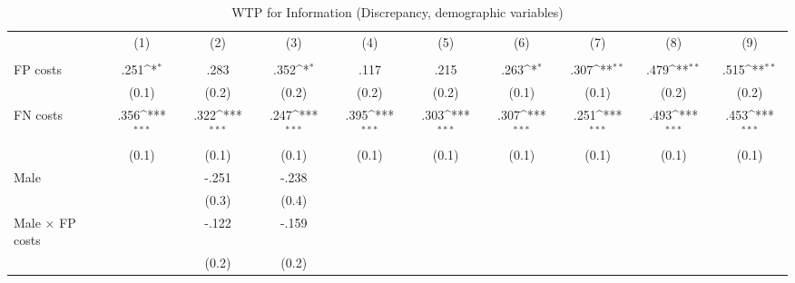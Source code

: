 \begin{table}[htbp]\centering
\def\sym#1{\ifmmode^{#1}\else\(^{#1}\)\fi}
\caption{WTP for Information (Discrepancy, demographic variables)}
\begin{tabular}{l*{9}{c}}
\hline\hline
                &\multicolumn{1}{c}{(1)}&\multicolumn{1}{c}{(2)}&\multicolumn{1}{c}{(3)}&\multicolumn{1}{c}{(4)}&\multicolumn{1}{c}{(5)}&\multicolumn{1}{c}{(6)}&\multicolumn{1}{c}{(7)}&\multicolumn{1}{c}{(8)}&\multicolumn{1}{c}{(9)}\\
                &\multicolumn{1}{c}{}&\multicolumn{1}{c}{}&\multicolumn{1}{c}{}&\multicolumn{1}{c}{}&\multicolumn{1}{c}{}&\multicolumn{1}{c}{}&\multicolumn{1}{c}{}&\multicolumn{1}{c}{}&\multicolumn{1}{c}{}\\
\hline
FP costs        &     .251\sym{*}  &     .283         &     .352\sym{*}  &     .117         &     .215         &     .263\sym{*}  &     .307\sym{**} &     .479\sym{**} &     .515\sym{**} \\
                &    (0.1)         &    (0.2)         &    (0.2)         &    (0.2)         &    (0.2)         &    (0.1)         &    (0.1)         &    (0.2)         &    (0.2)         \\
FN costs        &     .356\sym{***}&     .322\sym{***}&     .247\sym{***}&     .395\sym{***}&     .303\sym{***}&     .307\sym{***}&     .251\sym{***}&     .493\sym{***}&     .453\sym{***}\\
                &    (0.1)         &    (0.1)         &    (0.1)         &    (0.1)         &    (0.1)         &    (0.1)         &    (0.1)         &    (0.1)         &    (0.1)         \\
Male            &                  &    -.251         &    -.238         &                  &                  &                  &                  &                  &                  \\
                &                  &    (0.3)         &    (0.4)         &                  &                  &                  &                  &                  &                  \\
Male $\times$ FP costs&                  &    -.122         &    -.159         &                  &                  &                  &                  &                  &                  \\
                &                  &    (0.2)         &    (0.2)         &                  &                  &                  &                  &                  &                  \\

\end{tabular}
\end{table}

